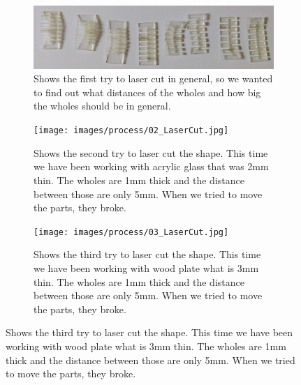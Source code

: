 \documentclass[doc.tex]{subfiles}
\begin{document}
        \begin{figure}[H]
            \centering
            \begin{subfigure}{.45\textwidth}
              \centering
              \includegraphics[width=0.8\linewidth]{images/process/01_LaserCut.jpg}
              \caption{Shows the first try to laser cut in general, so we wanted to
                       find out what distances of the wholes and how big the wholes 
                       should be in general.}
              \label{fig:01_LaserCut}
              \vspace{6mm}
            \end{subfigure}
            \medskip
            \hspace{1mm}
            \begin{subfigure}{.45\textwidth}
                \centering
                \texttt{[image: images/process/02\_LaserCut.jpg]}
                \caption{Shows the second try to laser cut the shape. This time we have been
                         working with acrylic glass that was 2mm thin. The wholes are 1mm thick 
                         and the distance between those are only 5mm. When we tried to move
                         the parts, they broke.}
                \label{fig:02_LaserCut}
                \vspace{6mm}
            \end{subfigure}
            \hspace{1mm}
            \begin{subfigure}{.45\textwidth}
                \centering
                \texttt{[image: images/process/03\_LaserCut.jpg]}
                \caption{Shows the third try to laser cut the shape. This time we have been
                         working with wood plate what is 3mm thin. The wholes are 1mm thick 
                         and the distance between those are only 5mm. When we tried to move
                         the parts, they broke.}
                \label{fig:03_LaserCut}
                \vspace{6mm}
            \end{subfigure}
            \hspace{1mm}

\end{figure}
\end{document}
